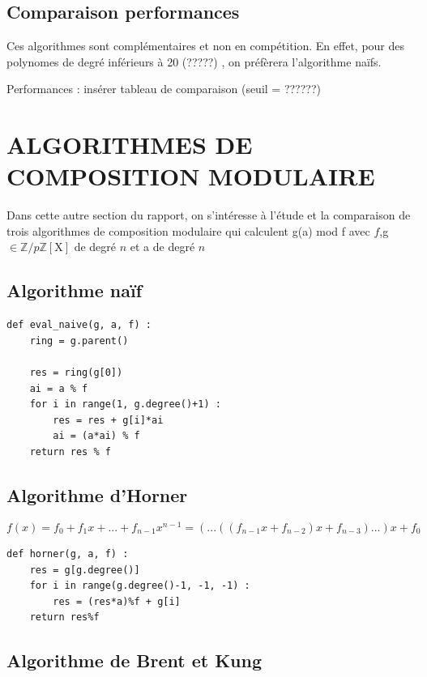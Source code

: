 \documentclass[a4paper]{article}
\begin{document}
\subsection{Comparaison performances}

\cite{aecf} Ces algorithmes sont complémentaires et non en compétition. En effet, pour des polynomes de degré inférieurs à 20 (?????) , on préfèrera l'algorithme naïfs.

Performances : insérer tableau de comparaison  (seuil = ??????)

\section{ALGORITHMES DE COMPOSITION MODULAIRE}

 Dans cette autre section du rapport, on s'intéresse à l'étude et la comparaison de trois algorithmes de composition modulaire qui calculent g(a) mod f avec $f$,g $\in \mathbb{Z}/p\mathbb{Z}[\mathrm{X}]$ de degré $n$ et a de degré $n$
 
\subsection{Algorithme naïf}

\begin{lstlisting}[title={naive}]
def eval_naive(g, a, f) :
	ring = g.parent()

	res = ring(g[0])
	ai = a % f
	for i in range(1, g.degree()+1) :
		res = res + g[i]*ai
		ai = (a*ai) % f
	return res % f
\end{lstlisting}

\subsection{Algorithme d'Horner}

\[
f(x)=f_0+f_1x+...+f_{n-1}x^{n-1}= (...((f_{n-1}x+f_{n-2})x+f_{n-3})...)x+f_0    
\]

\begin{lstlisting}[title={Horner}]
def horner(g, a, f) :
    res = g[g.degree()]
    for i in range(g.degree()-1, -1, -1) :
        res = (res*a)%f + g[i]
    return res%f
\end{lstlisting}

\subsection{Algorithme de Brent et Kung}
\end{document}
